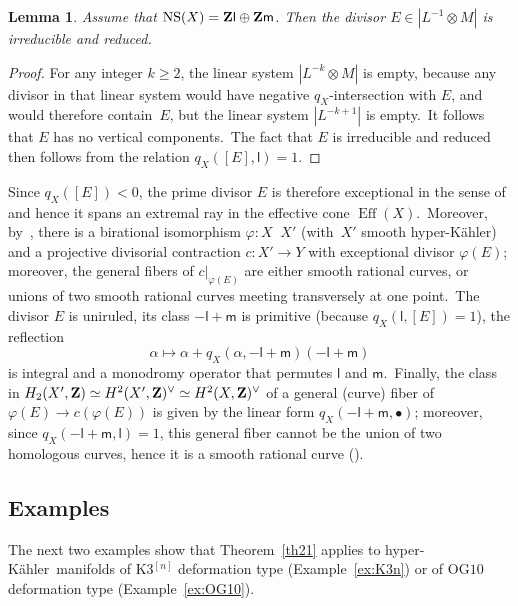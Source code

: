 \documentclass[12pt]{amsart}
\def\Z{{\bf Z}}
\def\phi{\varphi}
\DeclareMathOperator{\Eff}{Eff}
\DeclareMathOperator{\NS}{NS}
\def\isom{\simeq}
\def\dra{\dashrightarrow}
\DeclareMathOperator{\isomdra}{\stackrel{{}_{\scriptstyle\sim}}{\dra}}
\def\hk{hyper-K\"ahler}
\newtheorem{lemm}{Lemma}[section]
\theoremstyle{remark}
\def\lll{\ensuremath{\mathsf l}}
\def\mm{\ensuremath{\mathsf m}}
\begin{document}
\begin{lemm}\label{lem24}
Assume that $\NS(X)=\Z \lll \oplus \Z \mm$.
Then the divisor $E\in | L^{-1}\otimes M |$ is irreducible and reduced.
\end{lemm}

\begin{proof}
For any integer $k\ge 2$, the linear system $| L^{-k}\otimes M |$ is empty, because any divisor in that linear system would have negative $q_X$-intersection with $E$, and would therefore contain~$E$, but the linear system $|L^{-k+1}|$ is empty.\
It follows that $E$ has no vertical components.\ The fact that $E$ is   irreducible and reduced then follows from the relation $q_X([E],\lll)=1$.
\end{proof}

Since $q_X( [E])<0$, the prime divisor $E$ is therefore exceptional in the sense of \cite[d\'ef.~3.10]{bou} and
\cite[Definition~3.2]{mar} hence it spans an extremal ray in the effective cone $\Eff(X)$.\
Moreover, by~\cite[prop.~1.4 and rem.~4.3]{dru}, there is a birational isomorphism $\phi\colon X\isomdra X' $ (with~$X'$ smooth \hk) and a projective divisorial contraction $c\colon X'\to Y$ with exceptional divisor $\phi(E)$; moreover, the general fibers of $c\vert_{\phi(E)}$ are either smooth rational curves, or unions of two smooth rational curves meeting transversely at one point.\
The divisor $E$ is uniruled, its class $-\lll+\mm$ is primitive (because $q_X(\lll,[E])=1$), the reflection
\[
\alpha \longmapsto  \alpha+ q_X(\alpha,-\lll+\mm) (-\lll+\mm)
\]
is integral and a monodromy operator that permutes $\lll$ and $\mm$.\
Finally,  the class in $H_2(X',\Z)\isom H^2(X',\Z)^\vee\isom H^2(X,\Z)^\vee$ of a general (curve) fiber of $\phi(E)\to c(\phi(E))$ is given by the linear form $q_X(-\lll+\mm,\bullet)$; moreover, since $q_X(-\lll+\mm,\lll)=1$, this general fiber cannot be the union of two homologous curves, hence it is a smooth rational curve (\cite[Corollary~3.6]{mar}).\


\subsection{Examples}\label{subsec:SYZKnownExs}
 The next two examples show that Theorem~\ref{th21} applies to  \hk\ manifolds of K3$^{[n]}$ deformation type (Example~\ref{ex:K3n}) or of $\mathrm{OG10}$ deformation type (Example~\ref{ex:OG10}).
\end{document}
